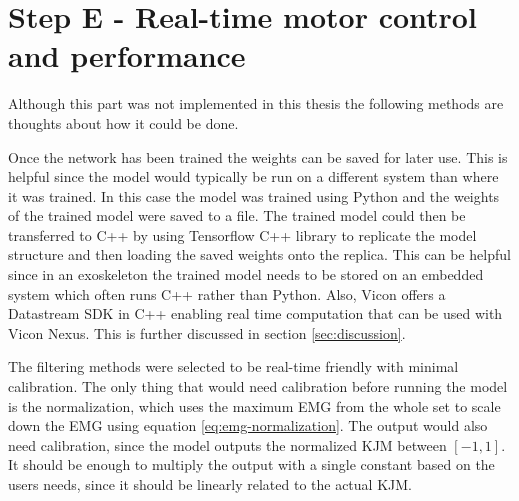 \documentclass[../main.tex]{subfiles}
\begin{document}
\section{Step E - Real-time motor control and performance}
Although this part was not implemented in this thesis the following methods are thoughts about how it could be done.

Once the network has been trained the weights can be saved for later use.
This is helpful since the model would typically be run on a different system than where it was trained.
In this case the model was trained using Python and the weights of the trained model were saved to a file.
The trained model could then be transferred to C++ by using Tensorflow C++ library to replicate the model structure and then loading the saved weights onto the replica.
This can be helpful since in an exoskeleton the trained model needs to be stored on an embedded system which often runs C++ rather than Python.
Also, Vicon offers a Datastream SDK in C++ enabling real time computation that can be used with Vicon Nexus.
This is further discussed in section \ref{sec:discussion}.

The filtering methods were selected to be real-time friendly with minimal calibration.
The only thing that would need calibration before running the model is the normalization, which uses the maximum \ac{EMG} from the whole set to scale down the \ac{EMG} using equation \ref{eq:emg-normalization}.
The output would also need calibration, since the model outputs the normalized \ac{KJM} between $\left[-1,1\right]$.
It should be enough to multiply the output with a single constant based on the users needs, since it should be linearly related to the actual \ac{KJM}.
\end{document}
